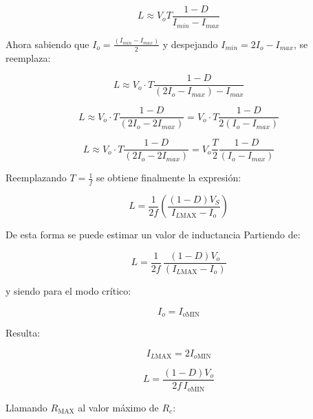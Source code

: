 \documentclass[]{article}
\begin{document}
	
	\begin{equation}
		L \approx  V_o  T \frac{  1 - D} {   I_{min} - {I_{max}}    } 
	\end{equation} 
	
	Ahora sabiendo que $I_o = \frac{(I_{min} - I_{max})}{2}$ y despejando $ I_{min} = 2I_o - I_{max}$, se reemplaza:
	
	\begin{equation}
		L \approx  V_o \cdot T \frac{  1 - D} {   (2I_o - I_{max}) - {I_{max}}    } 
	\end{equation} 


	\begin{equation}
		L \approx  V_o \cdot T \frac{  1 - D} {   (2I_o - 2I_{max})   }  = V_o \cdot T \frac{  1 - D} {   2(I_o - I_{max})   }
	\end{equation} 


	
	\begin{equation}
		L \approx  V_o \cdot T \frac{  1 - D} {   (2I_o - 2I_{max})   }  = V_o  \frac{T}{2} \frac{  1 - D} {   (I_o - I_{max})   }
	\end{equation} 

	Reemplazando $T = \frac{1}{f}$ se obtiene finalmente la expresión:
	
	\begin{equation}
		L =
		\frac{1}{2f}
		\left(
		\frac{(1-D)V_S}{I_{L\text{MAX}} - I_o}
		\right)
	\end{equation}

	De esta forma se puede estimar un valor de inductancia 
	Partiendo de:
	
	\begin{equation}
		L = \frac{1}{2f}\,\frac{(1-D)V_o}{(I_{L\text{MAX}} - I_o)}
	\end{equation}
	
	y siendo para el modo crítico:
	
	\begin{equation}
		I_o = I_{o\text{MIN}}
	\end{equation}
	
	Resulta:
	
	\begin{equation}
		I_{L\text{MAX}} = 2I_{o\text{MIN}}
	\end{equation}
	
	\begin{equation}
		L = \frac{(1-D)V_o}{2f\,I_{o\text{MIN}}}
	\end{equation}
	
	Llamando \(R_{\text{MAX}}\) al valor máximo de \(R_c\):
	
\end{document}

